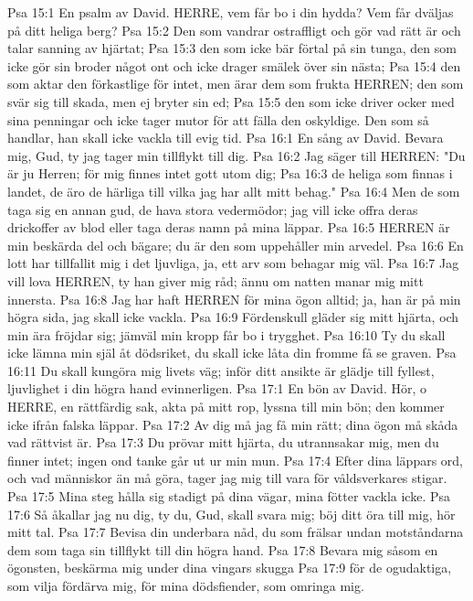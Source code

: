 Psa 15:1  En psalm av David. HERRE, vem får bo i din hydda? Vem får dväljas på ditt heliga berg?
Psa 15:2  Den som vandrar ostraffligt och gör vad rätt är och talar sanning av hjärtat;
Psa 15:3  den som icke bär förtal på sin tunga, den som icke gör sin broder något ont och icke drager smälek över sin nästa;
Psa 15:4  den som aktar den förkastlige för intet, men ärar dem som frukta HERREN; den som svär sig till skada, men ej bryter sin ed;
Psa 15:5  den som icke driver ocker med sina penningar och icke tager mutor för att fälla den oskyldige. Den som så handlar, han skall icke vackla till evig tid.
Psa 16:1  En sång av David. Bevara mig, Gud, ty jag tager min tillflykt till dig.
Psa 16:2  Jag säger till HERREN: "Du är ju Herren; för mig finnes intet gott utom dig;
Psa 16:3  de heliga som finnas i landet, de äro de härliga till vilka jag har allt mitt behag."
Psa 16:4  Men de som taga sig en annan gud, de hava stora vedermödor; jag vill icke offra deras drickoffer av blod eller taga deras namn på mina läppar.
Psa 16:5  HERREN är min beskärda del och bägare; du är den som uppehåller min arvedel.
Psa 16:6  En lott har tillfallit mig i det ljuvliga, ja, ett arv som behagar mig väl.
Psa 16:7  Jag vill lova HERREN, ty han giver mig råd; ännu om natten manar mig mitt innersta.
Psa 16:8  Jag har haft HERREN för mina ögon alltid; ja, han är på min högra sida, jag skall icke vackla.
Psa 16:9  Fördenskull gläder sig mitt hjärta, och min ära fröjdar sig; jämväl min kropp får bo i trygghet.
Psa 16:10  Ty du skall icke lämna min själ åt dödsriket, du skall icke låta din fromme få se graven.
Psa 16:11  Du skall kungöra mig livets väg; inför ditt ansikte är glädje till fyllest, ljuvlighet i din högra hand evinnerligen.
Psa 17:1  En bön av David. Hör, o HERRE, en rättfärdig sak, akta på mitt rop, lyssna till min bön; den kommer icke ifrån falska läppar.
Psa 17:2  Av dig må jag få min rätt; dina ögon må skåda vad rättvist är.
Psa 17:3  Du prövar mitt hjärta, du utrannsakar mig, men du finner intet; ingen ond tanke går ut ur min mun.
Psa 17:4  Efter dina läppars ord, och vad människor än må göra, tager jag mig till vara för våldsverkares stigar.
Psa 17:5  Mina steg hålla sig stadigt på dina vägar, mina fötter vackla icke.
Psa 17:6  Så åkallar jag nu dig, ty du, Gud, skall svara mig; böj ditt öra till mig, hör mitt tal.
Psa 17:7  Bevisa din underbara nåd, du som frälsar undan motståndarna dem som taga sin tillflykt till din högra hand.
Psa 17:8  Bevara mig såsom en ögonsten, beskärma mig under dina vingars skugga
Psa 17:9  för de ogudaktiga, som vilja fördärva mig, för mina dödsfiender, som omringa mig.
